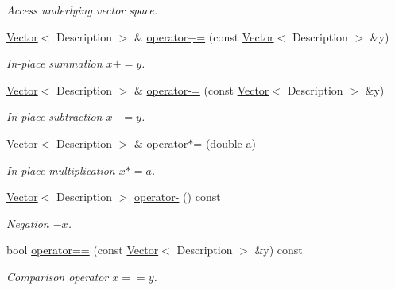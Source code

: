 \begin{DoxyCompactItemize}
\begin{DoxyCompactList}\small\item\em Access underlying vector space. \end{DoxyCompactList}\item 
\hyperlink{classSpacy_1_1Kaskade_1_1Vector}{Vector}$<$ Description $>$ \& \hyperlink{classSpacy_1_1AddArithmeticOperators_afad1d01e1e8c6f75290ac46d9b047ea8}{operator+=} (const \hyperlink{classSpacy_1_1Kaskade_1_1Vector}{Vector}$<$ Description $>$ \&y)
\begin{DoxyCompactList}\small\item\em In-\/place summation $ x+=y$. \end{DoxyCompactList}\item 
\hyperlink{classSpacy_1_1Kaskade_1_1Vector}{Vector}$<$ Description $>$ \& \hyperlink{classSpacy_1_1AddArithmeticOperators_a9fa91e177d13203cfe8cfa991c64ca36}{operator-\/=} (const \hyperlink{classSpacy_1_1Kaskade_1_1Vector}{Vector}$<$ Description $>$ \&y)
\begin{DoxyCompactList}\small\item\em In-\/place subtraction $ x-=y$. \end{DoxyCompactList}\item 
\hyperlink{classSpacy_1_1Kaskade_1_1Vector}{Vector}$<$ Description $>$ \& \hyperlink{classSpacy_1_1AddArithmeticOperators_a1d3db95b24fd2bc1de712c9e04c47e2f}{operator$\ast$=} (double a)
\begin{DoxyCompactList}\small\item\em In-\/place multiplication $ x*=a$. \end{DoxyCompactList}\item 
\hyperlink{classSpacy_1_1Kaskade_1_1Vector}{Vector}$<$ Description $>$ \hyperlink{classSpacy_1_1AddArithmeticOperators_a5acd030bf265d130983fd6e3c5b68be5}{operator-\/} () const
\begin{DoxyCompactList}\small\item\em Negation $ -x$. \end{DoxyCompactList}\item 
bool \hyperlink{classSpacy_1_1AddArithmeticOperators_a5ff1909f49f4a705d69663dc2d4b6316}{operator==} (const \hyperlink{classSpacy_1_1Kaskade_1_1Vector}{Vector}$<$ Description $>$ \&y) const
\begin{DoxyCompactList}\small\item\em Comparison operator $ x==y$. \end{DoxyCompactList}\end{DoxyCompactItemize}

